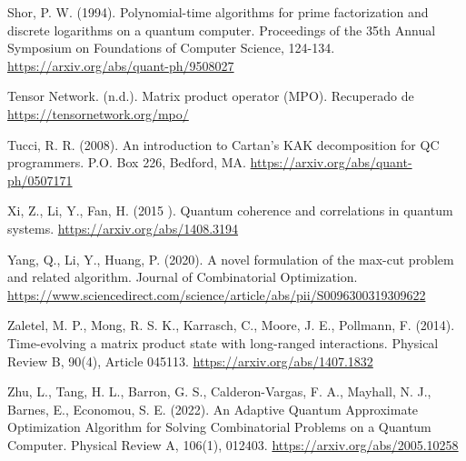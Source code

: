 \begin{thebibliography}{a}
\newpage

Shor, P. W. (1994). Polynomial-time algorithms for prime factorization and discrete logarithms on a quantum computer. Proceedings of the 35th Annual Symposium on Foundations of Computer Science, 124-134.
\url{https://arxiv.org/abs/quant-ph/9508027}

Tensor Network. (n.d.). Matrix product operator (MPO). Recuperado de
\url{https://tensornetwork.org/mpo/}

Tucci, R. R. (2008). An introduction to Cartan’s KAK decomposition for QC programmers. P.O. Box 226, Bedford, MA.
\url{https://arxiv.org/abs/quant-ph/0507171}

Xi, Z., Li, Y., Fan, H. (2015 ). Quantum coherence and correlations in quantum systems.
\url{https://arxiv.org/abs/1408.3194}

Yang, Q., Li, Y., Huang, P. (2020). A novel formulation of the max-cut problem and related algorithm. Journal of Combinatorial Optimization.
\url{https://www.sciencedirect.com/science/article/abs/pii/S0096300319309622}

Zaletel, M. P., Mong, R. S. K., Karrasch, C., Moore, J. E., Pollmann, F. (2014). Time-evolving a matrix product state with long-ranged interactions. Physical Review B, 90(4), Article 045113.
\url{https://arxiv.org/abs/1407.1832}

Zhu, L., Tang, H. L., Barron, G. S., Calderon-Vargas, F. A., Mayhall, N. J., Barnes, E., Economou, S. E. (2022). An Adaptive Quantum Approximate Optimization Algorithm for Solving Combinatorial Problems on a Quantum Computer. Physical Review A, 106(1), 012403. \url{https://arxiv.org/abs/2005.10258}

\end{thebibliography}